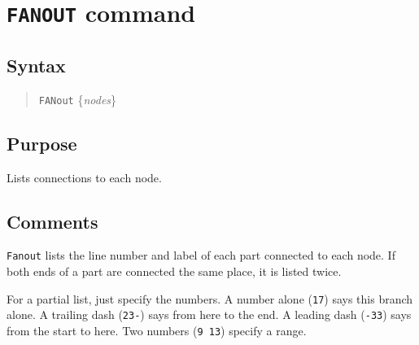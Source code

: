 %
%
%
%
\section{{\tt FANOUT} command}
\subsection{Syntax}
\begin{verse}
{\tt FANout} \{{\it nodes}\}
\end{verse}
\subsection{Purpose}

Lists connections to each node.
\subsection{Comments}

{\tt Fanout} lists the line number and label of each part connected to each
node.  If both ends of a part are connected the same place, it is listed
twice.

For a partial list, just specify the numbers.  A number alone ({\tt 17}) says
this branch alone.  A trailing dash ({\tt 23-}) says from here to the end.  A
leading dash ({\tt -33}) says from the start to here.  Two numbers ({\tt 9
13}) specify a range.

